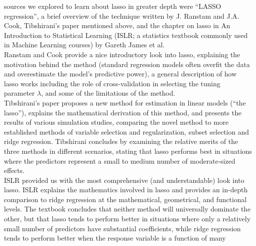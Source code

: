 \documentclass[
]{article}
\begin{document}
sources we explored to learn about lasso in greater depth were ``LASSO
regression'', a brief overview of the technique written by J. Ranstam
and J.A. Cook, Tibshirani's paper mentioned above, and the chapter on
lasso in An Introduction to Statistical Learning (ISLR; a statistics
textbook commonly used in Machine Learning courses) by Gareth James et
al.~\\
\hspace*{0.333em}\hspace*{0.333em}\hspace*{0.333em}\hspace*{0.333em}Ranstam
and Cook provide a nice introductory look into lasso, explaining the
motivation behind the method (standard regression models often overfit
the data and overestimate the model's predictive power), a general
description of how lasso works including the role of cross-validation in
selecting the tuning parameter \(\lambda\), and some of the limitations
of the method.\\
\hspace*{0.333em}\hspace*{0.333em}\hspace*{0.333em}\hspace*{0.333em}Tibshirani's
paper proposes a new method for estimation in linear models (``the
lasso''), explains the mathematical derivation of this method, and
presents the results of various simulation studies, comparing the novel
method to more established methods of variable selection and
regularization, subset selection and ridge regression. Tibshirani
concludes by examining the relative merits of the three methods in
different scenarios, stating that lasso performs best in situations
where the predictors represent a small to medium number of
moderate-sized effects.\\
\hspace*{0.333em}\hspace*{0.333em}\hspace*{0.333em}\hspace*{0.333em}ISLR
provided us with the most comprehensive (and understandable) look into
lasso. ISLR explains the mathematics involved in lasso and provides an
in-depth comparison to ridge regression at the mathematical,
geometrical, and functional levels. The textbook concludes that neither
method will universally dominate the other, but that lasso tends to
perform better in situations where only a relatively small number of
predictors have substantial coefficients, while ridge regression tends
to perform better when the response variable is a function of many
\end{document}
